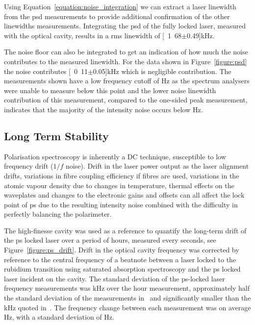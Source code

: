 Using Equation~\ref{equation:noise_integration} we can extract a laser linewidth from the \gls{psd} measurements to provide additional confirmation of the other linewidths measurements.
Integrating the \gls{psd} of the fully locked laser, measured with the optical cavity, results in a \gls{rms} linewidth of \unit[1.68$\pm$0.49]{kHz}.

The noise floor can also be integrated to get an indication of how much the noise contributes to the measured linewidth.
For the data shown in Figure~\ref{figure:psd} the noise contributes \unit[0.11$\pm$0.05]{kHz} which is negligible contribution.
The measurements shown have a low frequency cutoff of \unit[24]{Hz} as the spectrum analysers were unable to measure below this point and the lower noise linewidth contribution of this measurement, compared to the one-sided peak measurement, indicates that the majority of the intensity noise occurs below \unit[24]{Hz}.

\subsection{Long Term Stability}

Polarisation spectroscopy is inherently a DC technique, susceptible to low frequency drift ($1/f$ noise).
Drift in the laser power output as the laser alignment drifts, variations in fibre coupling efficiency if fibres are used, variations in the atomic vapour density due to changes in temperature, thermal effects on the waveplates and changes to the electronic gains and offsets can all affect the lock point of \gls{ps} due to the resulting intensity noise combined with the difficulty in perfectly balancing the polarimeter.

The high-finesse cavity was used as a reference to quantify the long-term drift of the \gls{ps} locked laser over a period of \unit[60]{hours}, measured every \unit[10]{seconds}, see Figure~\ref{figure:ps_drift}.
Drift in the optical cavity frequency was corrected by reference to the central frequency of a beatnote between a laser locked to the rubidium transition using saturated absorption spectroscopy and the \gls{ps} locked laser incident on the cavity.
The standard deviation of the \gls{ps}-locked laser frequency measurements was \unit[51]{kHz} over the \unit[60]{hour} measurement, approximately half the standard deviation of the measurements in~\cite{tiwari_laser_2006} and significantly smaller than the \unit[400]{kHz} quoted in~\cite{lee_frequency_2014}.
The frequency change between each measurement was on average \unit[5]{Hz}, with a standard deviation of \unit[210]{Hz}.

